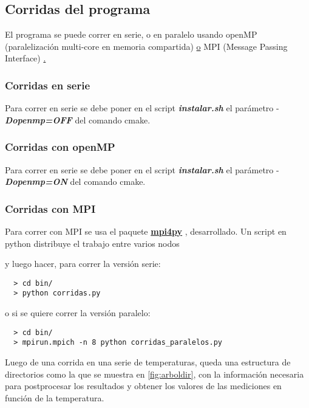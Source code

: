 \subsection{Corridas del programa}

El programa se puede correr en serie, o en paralelo usando openMP 
(paralelización multi-core en memoria compartida) \href{http://openmp.org/}
o MPI (Message Passing Interface) \href{http://www.open-mpi.org/} .

\subsubsection{Corridas en serie}
Para correr en serie se debe poner en el script \textbf{\textit{instalar.sh}}
el parámetro -\textbf{\textit{Dopenmp=OFF}} del comando cmake.

\subsubsection{Corridas con openMP}
Para correr en serie se debe poner en el script \textbf{\textit{instalar.sh}}
el parámetro -\textbf{\textit{Dopenmp=ON}} del comando cmake.

\subsubsection{Corridas con MPI}

Para correr con MPI se usa 
el paquete \href{http://mpi4py.scipy.org/} {\textbf{mpi4py}} ,  desarrollado.
Un script en python distribuye el trabajo entre varios nodos  



y luego hacer, para correr la versión serie:

\begin{verbatim}
  > cd bin/
  > python corridas.py
\end{verbatim}

o si se quiere correr la versión paralelo:

\begin{verbatim}
  > cd bin/
  > mpirun.mpich -n 8 python corridas_paralelos.py
\end{verbatim}

Luego de una corrida en una serie de temperaturas, queda una estructura de directorios
como la que se muestra en \eqref{fig:arboldir}, con la información necesaria 
para postprocesar
los resultados y obtener los valores de las mediciones en función de la temperatura.


